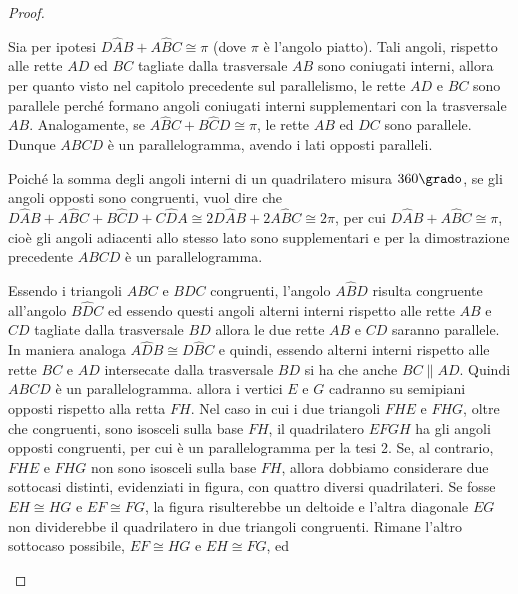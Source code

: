 \begin{proof}~\\
\begin{enumerate*}
\item Sia per ipotesi \(D\widehat{A}B+A\widehat{B}C\cong \pi\) (dove 
\(\pi\) è l'angolo piatto). Tali angoli, rispetto alle rette \(AD\) ed 
\(BC\) tagliate dalla trasversale \(AB\) sono coniugati interni, allora 
per quanto visto nel capitolo precedente sul parallelismo, le rette 
\(AD\) e \(BC\) sono parallele perché formano angoli coniugati interni 
supplementari con la trasversale \(AB\). Analogamente, se 
\(A\widehat{B}C+B\widehat{C}D\cong \pi\), le rette \(AB\) ed \(DC\) sono 
parallele. Dunque \(ABCD\) è un parallelogramma, avendo i lati opposti 
paralleli.
\item Poiché la somma degli angoli interni di un quadrilatero misura 
\(360\grado\), se gli angoli opposti sono congruenti, vuol dire che 
\(D\widehat{A}B+A\widehat{B}C+B\widehat{C}D+C\widehat{D}A\cong 
2D\widehat{A}B+2A\widehat{B}C\cong 2\pi\), per cui 
\(D\widehat{A}B+A\widehat{B}C\cong\pi\), cioè gli angoli adiacenti allo 
stesso lato sono supplementari e per la dimostrazione precedente 
\(ABCD\) è un parallelogramma.
\item Essendo i triangoli \(ABC\) e \(BDC\) congruenti, l'angolo 
\(A\widehat{B}D\) risulta congruente all'angolo \(B\widehat{D}C\) ed 
essendo questi angoli alterni interni rispetto alle rette \(AB\) e \(CD\) 
tagliate dalla trasversale \(BD\) allora le due rette \(AB\) e \(CD\) 
saranno parallele. In maniera analoga \(A\widehat{D}B\cong 
D\widehat{B}C\) e quindi, essendo alterni interni rispetto alle rette 
\(BC\) e \(AD\) intersecate dalla trasversale \(BD\) si ha che anche 
\(BC\parallel AD\). Quindi \(ABCD\) è un parallelogramma.
allora i vertici \(E\) e \(G\) cadranno su semipiani opposti rispetto 
alla retta \(FH\). Nel caso in cui i due triangoli \(FHE\) e \(FHG\), oltre 
che congruenti, sono isosceli sulla base \(FH\), il quadrilatero \(EFGH\) 
ha gli angoli opposti congruenti, per cui è un parallelogramma per la 
tesi 2. Se, al contrario, \(FHE\) e \(FHG\) non sono isosceli sulla base 
\(FH\), allora dobbiamo considerare due sottocasi distinti, evidenziati 
in figura, con quattro diversi quadrilateri. Se fosse \(EH\cong HG\) e 
\(EF\cong FG\), la figura risulterebbe un deltoide e l'altra diagonale 
\(EG\) non dividerebbe il quadrilatero in due triangoli congruenti. 
Rimane l'altro sottocaso possibile, \(EF\cong HG\) e \(EH\cong FG\), ed 

\end{enumerate*}
\end{proof}
